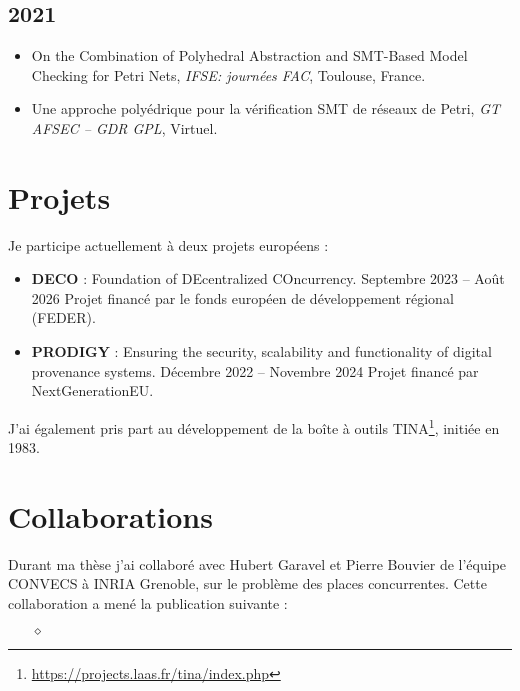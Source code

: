 \vspace{5pt}
\subsection*{2021}

\vspace{5pt}
\begin{itemize}
  \item On the Combination of Polyhedral Abstraction and SMT-Based Model
  Checking for Petri Nets, \textit{IFSE: journées FAC}, Toulouse, France.

  \item Une approche polyédrique pour la vérification SMT de réseaux de Petri,
  \textit{GT AFSEC -- GDR GPL}, Virtuel.
\end{itemize}

\vspace{10pt}
\section{Projets}
\vspace{10pt}
Je participe actuellement à deux projets européens :

\begin{itemize}
  \item \textbf{DECO} : Foundation of DEcentralized COncurrency. 
  \smallbreak
  Septembre 2023 -- Août 2026
  \smallbreak
  Projet financé
  par le fonds européen de développement régional (FEDER).
  \smallbreak
  \item \textbf{PRODIGY} : Ensuring the security, scalability and functionality of digital provenance systems.
  \smallbreak
  Décembre 2022 -- Novembre 2024
  \smallbreak
  Projet financé par NextGenerationEU.
\end{itemize}
\smallbreak

J'ai également pris part au développement de la boîte à outils
TINA\footnote{\url{https://projects.laas.fr/tina/index.php}}, initiée en 1983.

\vspace{10pt}
\section{Collaborations}
\vspace{10pt}

Durant ma thèse j'ai collaboré avec Hubert Garavel et Pierre Bouvier de l'équipe
CONVECS à INRIA Grenoble, sur le problème des places concurrentes. Cette
collaboration a mené la publication suivante :

\begin{itemize}
  \item[$\diamond$] 
\end{itemize}



